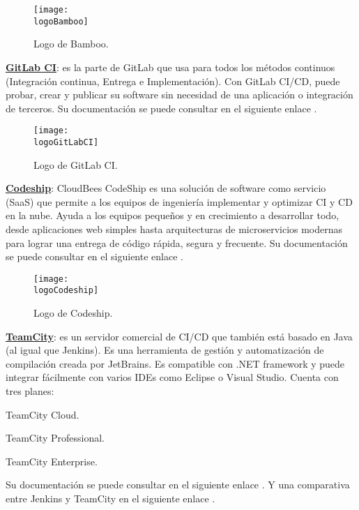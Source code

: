 \begin{compactitem}
    \begin{figure}[h]
        \centering
        \texttt{[image: \\logoBamboo]}
        \caption{Logo de Bamboo.}
    \end{figure}
    \item \textbf{\underline{GitLab CI}}: es la parte de GitLab que usa para todos los métodos continuos (Integración continua, Entrega e Implementación). Con GitLab CI/CD, puede probar, crear y publicar su software sin necesidad de una aplicación o integración de terceros. Su documentación se puede consultar en el siguiente enlace \cite{gitlabCI}.
    \begin{figure}[h]
        \centering
        \texttt{[image: \\logoGitLabCI]}
        \caption{Logo de GitLab CI.}
    \end{figure}
    \item \textbf{\underline{Codeship}}: CloudBees CodeShip es una solución de software como servicio (SaaS) que permite a los equipos de ingeniería implementar y optimizar CI y CD en la nube. Ayuda a los equipos pequeños y en crecimiento a desarrollar todo, desde aplicaciones web simples hasta arquitecturas de microservicios modernas para lograr una entrega de código rápida, segura y frecuente. Su documentación se puede consultar en el siguiente enlace \cite{codeship}.
    \begin{figure}[h]
        \centering
        \texttt{[image: \\logoCodeship]}
        \caption{Logo de Codeship.}
    \end{figure}
    \item \textbf{\underline{TeamCity}}: es un servidor comercial de CI/CD que también está basado en Java (al igual que Jenkins). Es una herramienta de gestión y automatización de compilación creada por JetBrains.
    Es compatible con .NET framework y puede integrar fácilmente con varios IDEs como Eclipse o Visual Studio.
    Cuenta con tres planes:
    \begin{compactitem}
        \item TeamCity Cloud.
        \item TeamCity Professional.
        \item TeamCity Enterprise.
    \end{compactitem}

    Su documentación se puede consultar en el siguiente enlace \cite{teamcity}. Y una comparativa entre Jenkins y TeamCity en el siguiente enlace \cite{jenkins_teamcity}.


\end{compactitem}
